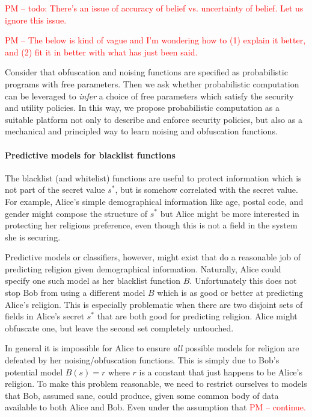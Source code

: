 \documentclass{article} %
\newcommand{\pxm}[1]{\textcolor{red}{PM -- #1}}
\newcommand{\asecret}[0]{s}
\newcommand{\rsecret}[0]{\asecret^*}
\theoremstyle{plain} %
\theoremstyle{definition} %
\begin{document}
\pxm{todo: There's an issue of accuracy of belief vs. uncertainty of
  belief. Let us ignore this issue.}

\pxm{The below is kind of vague and I'm wondering how to (1) explain
  it better, and (2) fit it in better with what has just been said.}

Consider that obfuscation and noising functions are specified as
probabilistic programs with free parameters. Then we ask whether
probabilistic computation can be leveraged to \emph{infer} a choice of
free parameters which satisfy the security and utility policies.  In
this way, we propose probabilistic computation as a suitable platform
not only to describe and enforce security policies, but also as a
mechanical and principled way to learn noising and obfuscation
functions.
 
\paragraph*{Predictive models for blacklist functions} The blacklist
(and whitelist) functions are useful to protect information which is
not part of the secret value $ \rsecret $, but is somehow correlated
with the secret value. For example, Alice's simple demographical
information like age, postal code, and gender might compose the
structure of $ \rsecret $ but Alice might be more interested in
protecting her religions preference, even though this is not a field
in the system she is securing.

Predictive models or classifiers, however, might exist that do a
reasonable job of predicting religion given demographical
information. Naturally, Alice could specify one such model as her
blacklist function $ B $. Unfortunately this does not stop Bob from
using a different model $ B $ which is as good or better at predicting
Alice's religion. This is especially problematic when there are two
disjoint sets of fields in Alice's secret $ \rsecret $ that are both good for
predicting religion. Alice might obfuscate one, but leave the second
set completely untouched.

In general it is impossible for Alice to ensure \emph{all} possible
models for religion are defeated by her noising/obfuscation
functions. This is simply due to Bob's potential model $ B(s) = r $
where $ r $ is a constant that just happens to be Alice's religion. To
make this problem reasonable, we need to restrict ourselves to models
that Bob, assumed sane, could produce, given some common body of data
available to both Alice and Bob. Even under the assumption that
\pxm{continue.}
\end{document}
